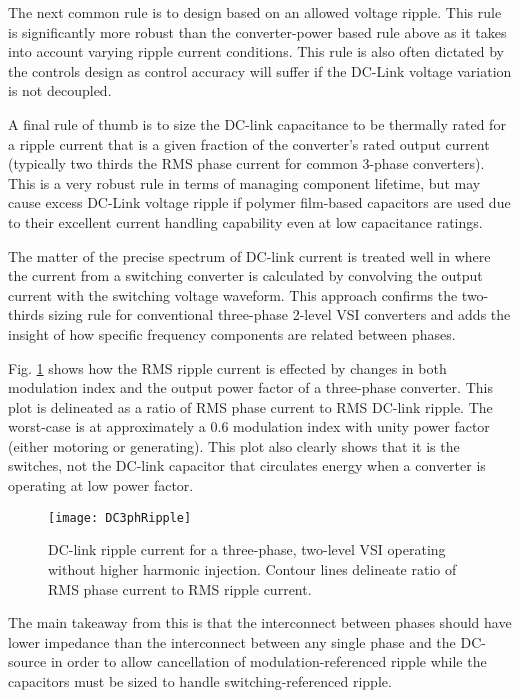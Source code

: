 The next common rule is to design based on an allowed voltage ripple.
This rule is significantly more robust than the converter-power based rule
above as it takes into account varying ripple current conditions.
This rule is also often dictated by the controls design as control accuracy
will suffer if the DC-Link voltage variation is not decoupled.

A final rule of thumb is to size the DC-link capacitance to be thermally rated
for a ripple current that is a given fraction of the converter's rated output
current (typically two thirds the RMS phase current for common 3-phase
converters).
This is a very robust rule in terms of managing component lifetime, but may
cause excess DC-Link voltage ripple if polymer film-based capacitors are used
due to their excellent current handling capability even at low capacitance
ratings.

The matter of the precise spectrum of DC-link current is treated well in
\cite{McGrath09} where the current from a switching converter is calculated by
convolving the output current with the switching voltage waveform.
This approach confirms the two-thirds sizing rule for conventional three-phase
2-level VSI converters and adds the insight of how specific frequency
components are related between phases.

Fig. \ref{fig3phCur} shows how the RMS ripple current is effected by changes
in both modulation index and the output power factor of a three-phase
converter.
This plot is delineated as a ratio of RMS phase current to RMS DC-link ripple.
The worst-case is at approximately a 0.6 modulation index with unity power
factor (either motoring or generating).
This plot also clearly shows that it is the switches, not the DC-link
capacitor that circulates energy when a converter is operating at low power
factor.

\begin{figure}[htbp]
\centering
\label{fig3phCur}
\texttt{[image: DC3phRipple]}
\caption{DC-link ripple current for a three-phase, two-level VSI operating
without higher harmonic injection.  Contour lines delineate ratio of RMS phase
current to RMS ripple current.}
\end{figure}

The main takeaway from this is that the interconnect between phases should
have lower impedance than the interconnect between any single phase and the
DC-source in order to allow cancellation of modulation-referenced ripple while
the capacitors must be sized to handle switching-referenced ripple.

